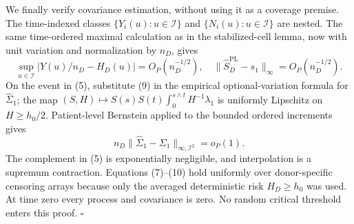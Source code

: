 We finally verify covariance estimation, without using it as a coverage premise. The time-indexed classes \(\{Y_i(u):u\in\mathcal I\}\) and \(\{N_i(u):u\in\mathcal I\}\) are nested. The same time-ordered maximal calculation as in the stabilized-cell lemma, now with unit variation and normalization by \(n_D\), gives
\[
 \sup_{u\in\mathcal I}|Y(u)/n_D-H_D(u)|=O_P(n_D^{-1/2}),
 \quad
 \|\widehat S_D^{\mathrm{PL}}-s_1\|_\infty=O_P(n_D^{-1/2}). \tag{9}
\]
On the event in (5), substitute (9) in the empirical optional-variation formula for \(\widehat\Sigma_1\); the map \((S,H)\mapsto S(s)S(t)\int_0^{s\wedge t}H^{-1}\lambda_1\) is uniformly Lipschitz on \(H\ge h_0/2\). Patient-level Bernstein applied to the bounded ordered increments gives
\[
 n_D\|\widehat\Sigma_1-\Sigma_1\|_{\infty,\mathcal I^2}=o_P(1). \tag{10}
\]
The complement in (5) is exponentially negligible, and interpolation is a supremum contraction. Equations (7)--(10) hold uniformly over donor-specific censoring arrays because only the averaged deterministic risk \(H_D\ge h_0\) was used. At time zero every process and covariance is zero. No random critical threshold enters this proof. \(\square\)